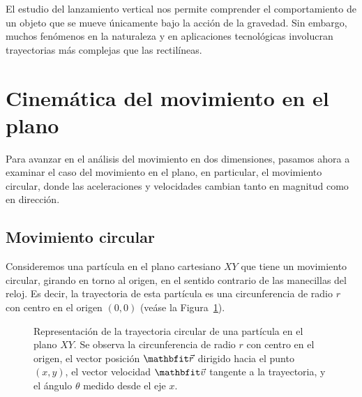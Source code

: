 El estudio del lanzamiento vertical nos permite comprender el comportamiento de un objeto que se mueve únicamente bajo la acción de la gravedad. Sin embargo, muchos fenómenos en la naturaleza y en aplicaciones tecnológicas involucran trayectorias más complejas que las rectilíneas.

\section{Cinemática del movimiento en el plano}

Para avanzar en el análisis del movimiento en dos dimensiones, pasamos ahora a examinar el caso del movimiento en el plano, en particular, el movimiento circular, donde las aceleraciones y velocidades cambian tanto en magnitud como en dirección.

\subsection{Movimiento circular}

Consideremos una partícula en el plano cartesiano $XY$ que tiene un movimiento circular, girando en torno al origen, en el sentido contrario de las manecillas del reloj. Es decir, la trayectoria de esta partícula es una circunferencia de radio $r$ con centro en el origen $(0,0)$ (veáse la Figura~\ref{fig:trayectoria}).
\begin{figure}
    \centering
    \caption{Representación de la trayectoria circular de una partícula en el plano $XY$. Se observa la circunferencia de radio $r$ con centro en el origen, el vector posición $\vecr$ dirigido hacia el punto $(x,y)$, el vector velocidad $\veloi$ tangente a la trayectoria, y el ángulo $\theta$ medido desde el eje $x$.}
    \label{fig:trayectoria}
\end{figure}

